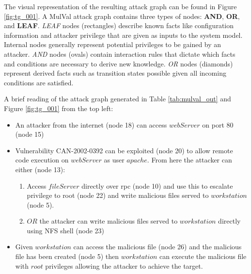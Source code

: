  The visual representation of the resulting attack graph can be found in Figure \ref{fig:tg_001}. A MulVal attack graph contains three types of nodes: \textbf{AND}, \textbf{OR}, and \textbf{LEAF}. \textit{LEAF} nodes (rectangles) describe known facts like configuration information and attacker privilege that are given as inputs to the system model. Internal nodes generally represent potential privileges to be gained by an attacker.  \textit{AND} nodes (ovals) contain interaction rules that dictate which facts and conditions are necessary to derive new knowledge. \textit{OR} nodes (diamonds) represent derived facts such as transition states possible given all incoming conditions are satisfied.


 A brief reading of the attack graph generated in Table \ref{tab:mulval_out} and Figure \ref{fig:tg_001} from the top left:
\begin{itemize}
\item An attacker from the internet (node 18) can access $webServer$ on port 80 (node 15)
\item Vulnerability CAN-2002-0392 can be exploited (node 20) to allow remote code execution on $webServer$ as user $apache$. From here the attacker can either (node 13):
\begin{enumerate}
\item Access $fileServer$ directly over rpc (node 10) and use this to escalate privilege to root (node 22) and write malicious files served to $workstation$ (node 5). 
\item $OR$ the attacker can write malicious files served to $workstation$ directly using NFS shell (node 23) 
\end{enumerate}
\item Given $workstation$ can access the malicious file (node 26) and the malicious file has been created (node 5) then $workstation$ can execute the malicious file with $root$ privileges allowing the attacker to achieve the target. 
\end{itemize}

